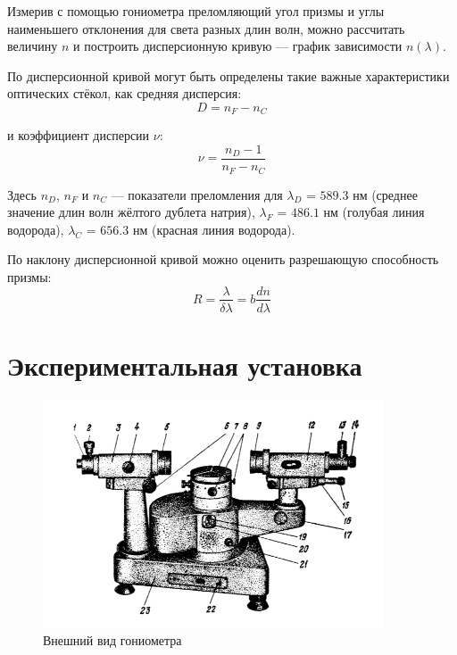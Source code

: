 \documentclass[12pt,a4paper]{article}
\begin{document}
	Измерив с помощью гониометра преломляющий угол призмы и углы наименьшего отклонения для света разных длин волн, можно рассчитать величину $n$ и построить дисперсионную кривую — график зависимости $n(\lambda)$.
	
	По дисперсионной кривой могут быть определены такие важные характеристики оптических стёкол, как средняя дисперсия:
	\begin{equation}
		D = n_F - n_C
        \label{eq:2}
	\end{equation}

	и коэффициент дисперсии $\nu$:
	\begin{equation}
		\nu = \frac{n_D - 1}{n_F - n_C}
        \label{eq:3}
	\end{equation}

	Здесь $n_D$, $n_F$ и $n_C$ — показатели преломления для $\lambda_D$ = $589.3$ нм (среднее значение длин волн жёлтого дублета натрия), $\lambda_F$ = $486.1$ нм (голубая линия водорода), $\lambda_C$ = $656.3$ нм (красная линия водорода).
	
	По наклону дисперсионной кривой можно оценить разрешающую способность призмы:
	\begin{equation}
		R = \frac{\lambda}{\delta \lambda} = b\frac{dn}{d\lambda}
	\end{equation}

 
	\section*{Экспериментальная установка}

    \begin{figure}[h]
		\begin{center}
			\includegraphics[width = 0.9\textwidth]{res/goniometr.png}
			\caption{Внешний вид гониометра}
            \label{fig:gon}
		\end{center}
	\end{figure}
\end{document}

